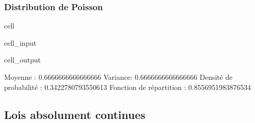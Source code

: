 \documentclass[letterpaper,10pt,french]{sphinxmanual}
\begin{document}
\subsubsection{Distribution de Poisson}
\label{\detokenize{elemstats:distribution-de-poisson}}
\begin{sphinxuseclass}{cell}
\begin{sphinxuseclass}{cell_input}
\begin{sphinxVerbatim}[commandchars=\\\{\}]
   

   
   

 
 
  
  
\end{sphinxVerbatim}

\end{sphinxuseclass}
\begin{sphinxuseclass}{cell_output}
\begin{sphinxVerbatim}[commandchars=\\\{\}]
Moyenne :  0.6666666666666666
Variance:  0.6666666666666666
Densité de probabilité :  0.3422780793550613
Fonction de répartition :  0.8556951983876534
\end{sphinxVerbatim}

\end{sphinxuseclass}
\end{sphinxuseclass}

\subsection{Lois absolument continues}
\label{\detokenize{elemstats:lois-absolument-continues}}
\end{document}
